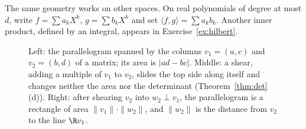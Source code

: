 The same geometry works on other spaces. On real polynomials of degree at most $d$, write $f=\sum a_kX^k$, $g=\sum b_kX^k$ and set $\langle f,g\rangle=\sum a_kb_k$. Another inner product, defined by an integral, appears in Exercise~\ref{ex:hilbert}.

\begin{figure}[ht]
\centering
{}
\caption{Left: the parallelogram spanned by the columns $v_1=(a,c)$ and $v_2=(b,d)$ of a matrix; its area is $|ad-bc|$. Middle: a shear, adding a multiple of $v_1$ to $v_2$, slides the top side along itself and changes neither the area nor the determinant (Theorem~\ref{thm:det}(d)). Right: after shearing $v_2$ into $w_2\perp v_1$, the parallelogram is a rectangle of area $\|v_1\|\cdot\|w_2\|$, and $\|w_2\|$ is the distance from $v_2$ to the line $\R v_1$.}
\label{fig:parallelogram}
\end{figure}

